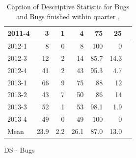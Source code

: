 \documentclass[UKenglish]{ifimaster}  %
\begin{document}
\begin{appendices}
\begin{table}[!htbp]
\begin{adjustwidth}{-2.5cm}{}
\begin{subfigure}[b]{0.4\textwidth}
{\begin{tabular}{ | l | r | r | r | r | r | r | }
2011-4 & 3 & 1 & 4 & 75 & 25 \\ \hline
2012-1 & 8 & 0 & 8 & 100 & 0 \\ \hline
2012-3 & 12 & 2 & 14 & 85.7 & 14.3 \\ \hline
2012-4 & 41 & 2 & 43 & 95.3 & 4.7 \\ \hline
2013-1 & 66 & 9 & 75 & 88 & 12 \\ \hline
2013-2 & 43 & 7 & 50 & 86 & 14 \\ \hline
2013-3 & 52 & 1 & 53 & 98.1 & 1.9 \\ \hline
2013-4 & 49 & 0 & 49 & 100 & 0 \\ \hline
Mean & 23.9&2.2&26.1&87.0&13.0 \\ \hline
\end{tabular}
}
\caption{DS - Bugs}
 \label{DS:FTPQ:6}
\end{subfigure}
\end{adjustwidth}
\caption[Optional caption for list of figures]{Caption of Descriptive Statistic for Bugs and Bugs finished within quarter  , }
\label{DS:6:5} %
\end{table}


 
 
 

\end{appendices}
\end{document}
